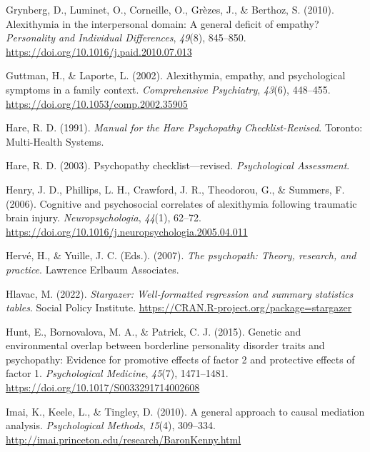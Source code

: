 \documentclass[
  man,floatsintext]{apa7}
\newlength{\cslhangindent}
\newlength{\cslentryspacingunit} %
\newenvironment{CSLReferences}[2] %
 {%
  \setlength{\parindent}{0pt}
  \ifodd #1
  \let\oldpar\par
  \def\par{\hangindent=\cslhangindent\oldpar}
  \fi
  \setlength{\parskip}{#2\cslentryspacingunit}
 }%
 {}
\begin{document}
\begin{CSLReferences}{1}{0}
\leavevmode{}%
Grynberg, D., Luminet, O., Corneille, O., Grèzes, J., \& Berthoz, S. (2010). Alexithymia in the interpersonal domain: {A} general deficit of empathy? \emph{Personality and Individual Differences}, \emph{49}(8), 845--850. \url{https://doi.org/10.1016/j.paid.2010.07.013}

\leavevmode{}%
Guttman, H., \& Laporte, L. (2002). Alexithymia, empathy, and psychological symptoms in a family context. \emph{Comprehensive Psychiatry}, \emph{43}(6), 448--455. \url{https://doi.org/10.1053/comp.2002.35905}

\leavevmode{}%
Hare, R. D. (1991). \emph{Manual for the {Hare Psychopathy Checklist-Revised}}. {Toronto: Multi-Health Systems}.

\leavevmode{}%
Hare, R. D. (2003). Psychopathy checklist---revised. \emph{Psychological Assessment}.

\leavevmode{}%
Henry, J. D., Phillips, L. H., Crawford, J. R., Theodorou, G., \& Summers, F. (2006). Cognitive and psychosocial correlates of alexithymia following traumatic brain injury. \emph{Neuropsychologia}, \emph{44}(1), 62--72. \url{https://doi.org/10.1016/j.neuropsychologia.2005.04.011}

\leavevmode{}%
Hervé, H., \& Yuille, J. C. (Eds.). (2007). \emph{The psychopath: Theory, research, and practice}. {Lawrence Erlbaum Associates}.

\leavevmode{}%
Hlavac, M. (2022). \emph{Stargazer: Well-formatted regression and summary statistics tables}. Social Policy Institute. \url{https://CRAN.R-project.org/package=stargazer}

\leavevmode{}%
Hunt, E., Bornovalova, M. A., \& Patrick, C. J. (2015). Genetic and environmental overlap between borderline personality disorder traits and psychopathy: Evidence for promotive effects of factor 2 and protective effects of factor 1. \emph{Psychological Medicine}, \emph{45}(7), 1471--1481. \url{https://doi.org/10.1017/S0033291714002608}

\leavevmode{}%
Imai, K., Keele, L., \& Tingley, D. (2010). A general approach to causal mediation analysis. \emph{Psychological Methods}, \emph{15}(4), 309--334. \url{http://imai.princeton.edu/research/BaronKenny.html}


\end{CSLReferences}
\end{document}
